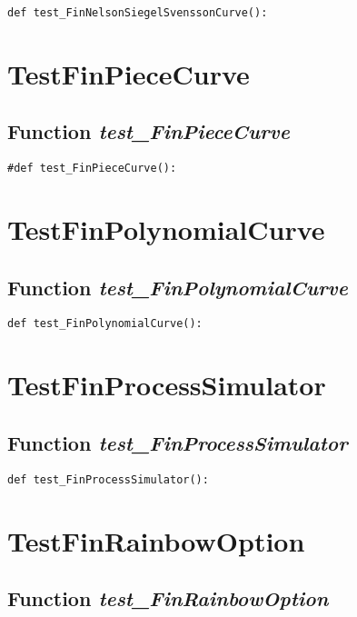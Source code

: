 \documentclass[twoside,11pt]{book}
\begin{document}
\begin{lstlisting}
def test_FinNelsonSiegelSvenssonCurve():
\end{lstlisting}


\newpage
\section{TestFinPieceCurve}

\subsection{Function {\it test\_FinPieceCurve}}


\begin{lstlisting}
#def test_FinPieceCurve():
\end{lstlisting}


\newpage
\section{TestFinPolynomialCurve}

\subsection{Function {\it test\_FinPolynomialCurve}}


\begin{lstlisting}
def test_FinPolynomialCurve(): 
\end{lstlisting}


\newpage
\section{TestFinProcessSimulator}

\subsection{Function {\it test\_FinProcessSimulator}}


\begin{lstlisting}
def test_FinProcessSimulator():
\end{lstlisting}


\newpage
\section{TestFinRainbowOption}

\subsection{Function {\it test\_FinRainbowOption}}
\end{document}
